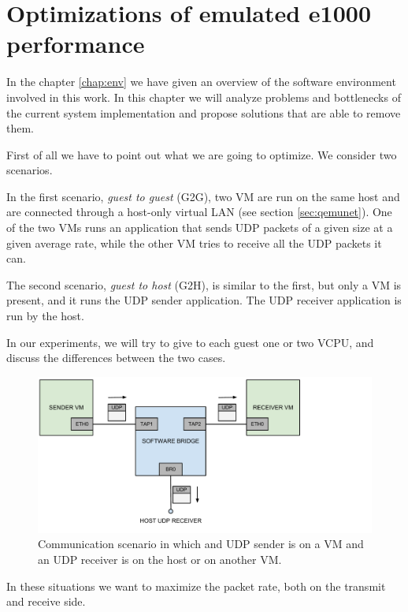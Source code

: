 \chapter{Optimizations of emulated e1000 performance}
\label{cha:e1000-opt}
In the chapter \ref{chap:env} we have given an overview of the software environment involved in this work.
In this chapter we will analyze problems and bottlenecks of the current system implementation and propose solutions that are able
to remove them.

\vspace{0.5cm}

First of all we have to point out what we are going to optimize. We consider two scenarios.

In the first scenario, \emph{guest to guest} (G2G), two VM are run on the same host and are connected through a host-only virtual LAN (see 
section \ref{sec:qemunet}). One of the two VMs runs an application that sends UDP packets of a given size at a given average rate, while 
the other VM tries to receive all the UDP packets it can.

The second scenario, \emph{guest to host} (G2H), is similar to the first, but only a VM is present, and it runs the UDP sender application. The UDP receiver application
is run by the host.

In our experiments, we will try to give to each guest one or two VCPU, and discuss the differences between the two cases.

\begin{figure}[bt]
\centering
\includegraphics[scale = 0.60]{scenario.pdf}
\caption{Communication scenario in which and UDP sender is on a VM and an UDP receiver is on the host or on another VM.}
\label{fig:scenario}
\end{figure}

\vspace{0.5cm}

In these situations we want to maximize the packet rate, both on the transmit and receive side.


